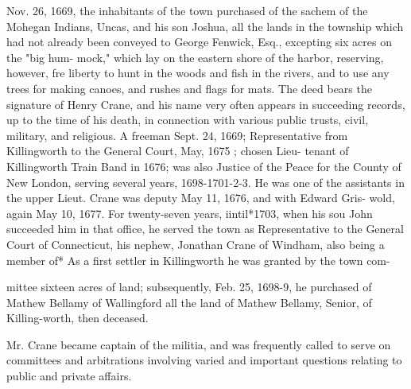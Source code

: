 \documentclass[oneside]{book}
\begin{document}
Nov. 26, 1669, the inhabitants of the town purchased of the 
sachem of the Mohegan Indians, Uncas, and his son Joshua, all 
the lands in the township which had not already been conveyed to 
George Fenwick, Esq., excepting six acres on the "big hum- 
mock," which lay on the eastern shore of the harbor, reserving, 
however, fre liberty to hunt in the woods and fish in the rivers, 
and to use any trees for making canoes, and rushes and flags for 
mats. The deed bears the signature of Henry Crane, and his 
name very often appears in succeeding records, up to the time of 
his death, in connection with various public trusts, civil, military, 
and religious. A freeman Sept. 24, 1669; Representative from 
Killingworth to the General Court, May, 1675 ; chosen Lieu- 
tenant of Killingworth Train Band in 1676; was also Justice of 
the Peace for the County of New London, serving several years, 
1698-1701-2-3. He was one of the assistants in the upper 
Lieut. Crane was deputy May 11, 1676, and with Edward Gris- 
wold, again May 10, 1677. For twenty-seven years, iintil*1703, 
when his sou John succeeded him in that office, he served the 
town as Representative to the General Court of Connecticut, his 
nephew, Jonathan Crane of Windham, also being a member of* 
As a first settler in Killingworth he was granted by the town com- 




mittee sixteen acres of land; subsequently, Feb. 25, 1698-9, he 
purchased of Mathew Bellamy of Wallingford all the land of 
Mathew Bellamy, Senior, of Killing-worth, then deceased. 

Mr. Crane became captain of the militia, and was frequently 
called to serve on committees and arbitrations involving varied 
and important questions relating to public and private affairs. 
\end{document}
